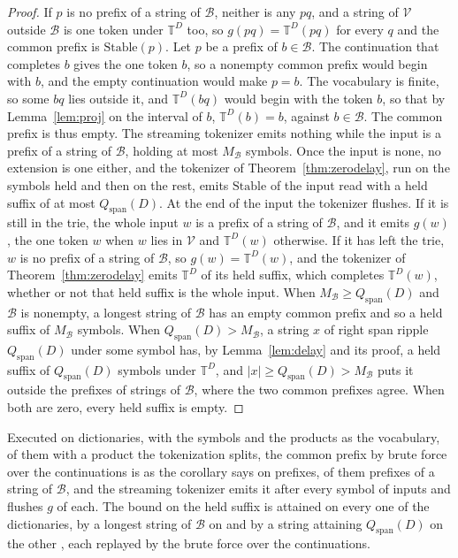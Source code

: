 \documentclass[11pt,a4paper]{article}
\theoremstyle{definition}
\theoremstyle{plain}
\newcommand{\T}{\mathbb{T}}
\newcommand{\Stable}{\mathrm{Stable}}
\begin{document}
\begin{proof}
If \(p\) is no prefix of a string of \(\mathcal{B}\), neither is any \(pq\), and a string of \(\mathcal{V}\) outside
\(\mathcal{B}\) is one token under \(\T^D\) too, so \(g(pq) = \T^D(pq)\) for every \(q\) and the common prefix is
\(\Stable(p)\). Let \(p\) be a prefix of \(b \in \mathcal{B}\). The continuation that completes \(b\) gives the one
token \(b\), so a nonempty common prefix would begin with \(b\), and the empty continuation would make \(p = b\). The
vocabulary is finite, so some \(bq\) lies outside it, and \(\T^D(bq)\) would begin with the token \(b\), so that by
Lemma~\ref{lem:proj} on the interval of \(b\), \(\T^D(b) = b\), against \(b \in \mathcal{B}\). The common prefix is thus
empty. The streaming tokenizer emits nothing while the input is a prefix of a string of \(\mathcal{B}\), holding at most
\(M_{\mathcal{B}}\) symbols. Once the input is none, no extension is one either, and the tokenizer of
Theorem~\ref{thm:zerodelay}, run on the symbols held and then on the rest, emits \(\Stable\) of the input read with a
held suffix of at most \(Q_{\mathrm{span}}(D)\). At the end of the input the tokenizer flushes. If it is still in the
trie, the whole input \(w\) is a prefix of a string of \(\mathcal{B}\), and it emits \(g(w)\), the one token \(w\) when
\(w\) lies in \(\mathcal{V}\) and \(\T^D(w)\) otherwise. If it has left the trie, \(w\) is no prefix of a string of
\(\mathcal{B}\), so \(g(w) = \T^D(w)\), and the tokenizer of Theorem~\ref{thm:zerodelay} emits \(\T^D\) of its held
suffix, which completes \(\T^D(w)\), whether or not that held suffix is the whole input. When
\(M_{\mathcal{B}} \ge Q_{\mathrm{span}}(D)\) and \(\mathcal{B}\) is nonempty, a longest string of \(\mathcal{B}\) has an
empty common prefix and so a held suffix of \(M_{\mathcal{B}}\) symbols. When
\(Q_{\mathrm{span}}(D) > M_{\mathcal{B}}\), a string \(x\) of right span ripple \(Q_{\mathrm{span}}(D)\) under some
symbol has, by Lemma~\ref{lem:delay} and its proof, a held suffix of \(Q_{\mathrm{span}}(D)\) symbols under \(\T^D\),
and \(|x| \ge Q_{\mathrm{span}}(D) > M_{\mathcal{B}}\) puts it outside the prefixes of strings of \(\mathcal{B}\), where
the two common prefixes agree. When both are zero, every held suffix is empty.
\end{proof}

Executed on \WholeDictionaries{} dictionaries, with the symbols and the products as the vocabulary, \WholeWithB{} of
them with a product the tokenization splits, the common prefix by brute force over the continuations is as the corollary
says on \WholePrefixes{} prefixes, \WholeInTrie{} of them prefixes of a string of \(\mathcal{B}\), and the streaming
tokenizer emits it after every symbol of \WholeInputs{} inputs and flushes \(g\) of each. The bound on the held suffix
is attained on every one of the \WholeDictionaries{} dictionaries, by a longest string of \(\mathcal{B}\) on \WholeByB{}
and by a string attaining \(Q_{\mathrm{span}}(D)\) on the other \WholeBySpan{}, each replayed by the brute force over
the continuations.
\end{document}
